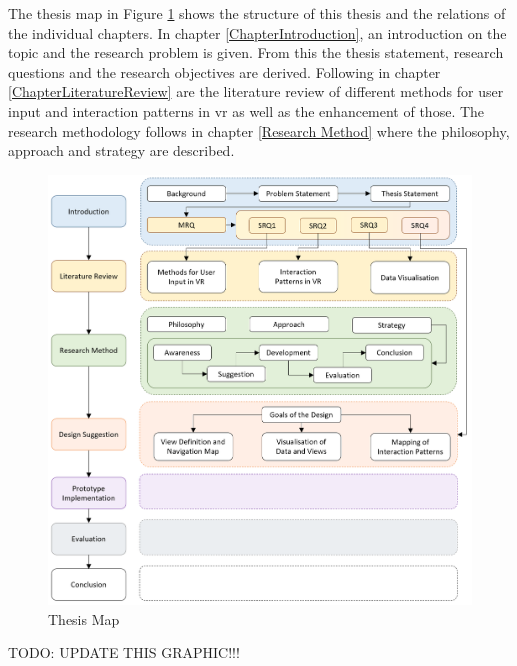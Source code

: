 The thesis map in Figure \ref{fig:thesismap} shows the structure of this thesis and the relations of the individual chapters. \newline
In chapter \ref{ChapterIntroduction}, an introduction on the topic and the research problem is given. From this the thesis statement, research questions and the research objectives are derived. Following in chapter \ref{ChapterLiteratureReview} are the literature review of different methods for user input and interaction patterns in \gls{vr} as well as the enhancement of those. The research methodology follows in chapter \ref{Research Method} where the philosophy, approach and strategy are described. \newline
\begin{figure}[pt]
	\begin{center}
		\includegraphics[width=14cm]{03_Figures/06_Introduction/ThesisMap.png}
		\caption{Thesis Map}
		\label{fig:thesismap}
	\end{center}
\end{figure}

TODO: UPDATE THIS GRAPHIC!!!





